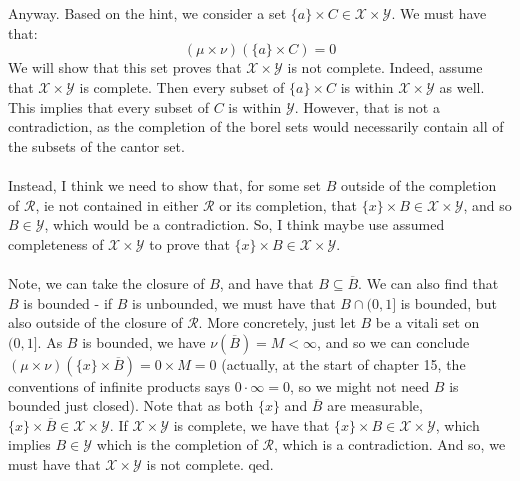 \documentclass[12pt,a4paper]{article}
\newcommand{\1}[1]{\mathbbm{1}\left\{ #1 \right\}}
\newcommand{\rcal}{\mathcal{R}}
\newcommand{\xcal}{\mathcal{X}}
\newcommand{\ycal}{\mathcal{Y}}
\begin{document}
\\\\
Anyway. Based on the hint, we consider a set $\{a\} \times C \in \xcal \times \ycal$. We must have that:
$$
	(\mu \times \nu)(\{a\} \times C) = 0
$$
We will show that this set proves that $\xcal \times \ycal$ is not complete. Indeed, assume that $\xcal \times \ycal$ is complete. Then every subset of $\{a\} \times C$ is within $\xcal \times \ycal$ as well. This implies that every subset of $C$ is within $\ycal$. However, that is not a contradiction, as the completion of the borel sets would necessarily contain all of the subsets of the cantor set.
\\\\
Instead, I think we need to show that, for some set $B$ outside of the completion of $\rcal$, ie not contained in either $\rcal$ or its completion, that $\{x\} \times B \in \xcal \times \ycal$, and so $B \in \ycal$, which would be a contradiction. So, I think maybe use assumed completeness of $\xcal \times \ycal$ to prove that $\{x\} \times B \in \xcal \times \ycal$.
\\\\
Note, we can take the closure of $B$, and have that $B \subseteq \overline{B}$. We can also find that $B$ is bounded - if $B$ is unbounded, we must have that $B \cap (0,1]$ is bounded, but also outside of the closure of $\rcal$. More concretely, just let $B$ be a vitali set on $(0,1]$. As $B$ is bounded, we have $\nu(\overline{B}) = M < \infty$, and so we can conclude $(\mu \times \nu)(\{x\} \times \overline{B}) = 0 \times M = 0$ (actually, at the start of chapter 15, the conventions of infinite products says $0 \cdot \infty = 0$, so we might not need $B$ is bounded just closed). Note that as both $\{x\}$ and $\overline{B}$ are measurable, $\{x\} \times \overline{B} \in \xcal \times \ycal$. If $\xcal \times \ycal$ is complete, we have that $\{x\} \times B \in \xcal \times \ycal$, which implies $B \in \ycal$ which is the completion of $\rcal$, which is a contradiction. And so, we must have that $\xcal \times \ycal$ is not complete. qed.
\end{document}
